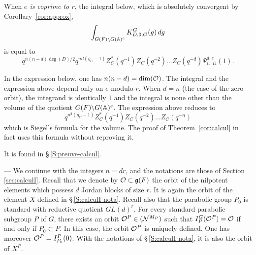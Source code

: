\begin{paragr}
\begin{theoreme}
\begin{enumerate}
    When \emph{$e$ is coprime to $r$}, the integral below, which is absolutely convergent by Corollary~\ref{cor:approx},
    $$\int_{G(F)\backslash G(\mathbb{A})^e} K^G_{D,0,\mathcal{O}}(g)\, dg$$
    is equal to
    $$q^{n(n-d)\deg(D)/2}q^{nd(g_C-1)}Z_C^*(q^{-1})Z_C(q^{-2})\ldots Z_C(q^{-d})\Psi^{d,e}_{C,D}(1).$$
  \end{enumerate}
\end{theoreme}

\begin{remarque}\label{rem:calcul}
In the expression below, one has $n(n-d)=\dim(\mathcal{O})$. The integral and the expression above depend only on $e$ modulo $r$. When $d=n$ (the case of the zero orbit), the integrand is identically $1$ and the integral is none other than the volume of the quotient $G(F)\backslash G(\mathbb{A})^e$. The expression above reduces to
$$q^{n^2(g_C-1)}Z_C^*(q^{-1})Z_C(q^{-2})\ldots Z_C(q^{-n})$$
which is Siegel's formula for the volume. The proof of Theorem~\ref{cor:calcul} in fact uses this formula without reproving it.
\end{remarque}

\begin{preuve}
It is found in \S\,\ref{S:preuve-calcul}.
\end{preuve}
\end{paragr}

\begin{paragr} ---\label{S:elementX}
We continue with the integers $n=dr$, and the notations are those of Section \ref{sec:calculI}. Recall that we denote by $\mathcal{O}\subset \mathfrak{g}(F)$ the orbit of the nilpotent elements which possess $d$ Jordan blocks of size $r$. It is again the orbit of the element $X$ defined in \S\,\ref{S:calculI-nota}. Recall also that the parabolic group $P_0$ is standard with reductive quotient $GL(d)^r$. For every standard parabolic subgroup $P$ of $G$, there exists an orbit $\mathcal{O}^P\in (\mathcal{N}^{M_P})$ such that $I_P^G(\mathcal{O}^P)=\mathcal{O}$ if and only if $P_0\subset P$. In this case, the orbit $\mathcal{O}^P$ is uniquely defined. One has moreover $\mathcal{O}^P=I^P_{P_0}(0)$. With the notations of \S\,\ref{S:calculI-nota}, it is also the orbit of $X^P$.
\end{paragr}

